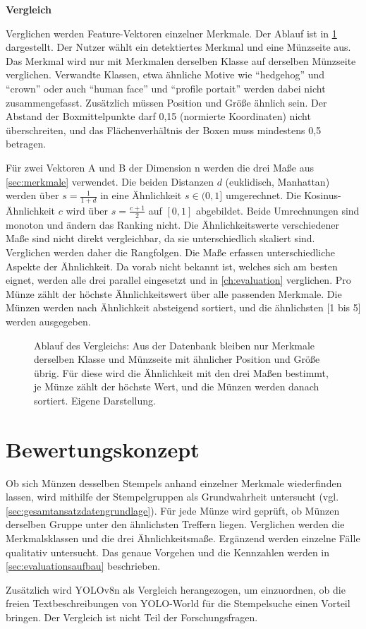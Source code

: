 \noindent \textbf{Vergleich}

\noindent Verglichen werden Feature-Vektoren einzelner Merkmale. Der Ablauf ist in \cref{fig:vergleich} dargestellt. Der Nutzer wählt ein detektiertes Merkmal und eine Münzseite aus. Das Merkmal wird nur mit Merkmalen derselben Klasse auf derselben Münzseite verglichen. Verwandte Klassen, etwa ähnliche Motive wie \enquote{hedgehog} und \enquote{crown} oder auch \enquote{human face} und \enquote{profile portait} werden dabei nicht zusammengefasst. Zusätzlich müssen Position und Größe ähnlich sein. Der Abstand der Boxmittelpunkte darf 0,15 (normierte Koordinaten) nicht überschreiten, und das Flächenverhältnis der Boxen muss mindestens 0,5 betragen.

Für zwei Vektoren A und B der Dimension n werden die drei Maße aus \cref{sec:merkmale} verwendet. Die beiden Distanzen $d$ (euklidisch, Manhattan) werden über $s = \frac{1}{1+d}$ in eine Ähnlichkeit $s \in (0, 1]$ umgerechnet. Die Kosinus-Ähnlichkeit $c$ wird über $s = \frac{c+1}{2}$ auf $[0, 1]$ abgebildet. Beide Umrechnungen sind monoton und ändern das Ranking nicht. Die Ähnlichkeitswerte verschiedener Maße sind nicht direkt vergleichbar, da sie unterschiedlich skaliert sind. Verglichen werden daher die Rangfolgen. Die Maße erfassen unterschiedliche Aspekte der Ähnlichkeit. Da vorab nicht bekannt ist, welches sich am besten eignet, werden alle drei parallel eingesetzt und in \cref{ch:evaluation} verglichen. 
Pro Münze zählt der höchste Ähnlichkeitswert über alle passenden Merkmale. Die Münzen werden nach Ähnlichkeit absteigend sortiert, und die ähnlichsten [1 bis 5] werden ausgegeben. 

\begin{figure}[H]
  \centering
  \resizebox{\linewidth}{!}{}
  \caption[Ablauf des Vergleichs]{Ablauf des Vergleichs: Aus der Datenbank bleiben nur Merkmale derselben Klasse und Münzseite mit ähnlicher Position und Größe übrig. Für diese wird die Ähnlichkeit mit den drei Maßen bestimmt, je Münze zählt der höchste Wert, und die Münzen werden danach sortiert. Eigene Darstellung.}
  \label{fig:vergleich}
\end{figure}

\section{Bewertungskonzept}
\label{sec:bewertungskonzept}
Ob sich Münzen desselben Stempels anhand einzelner Merkmale wiederfinden lassen, wird mithilfe der Stempelgruppen als Grundwahrheit untersucht (vgl. \cref{sec:gesamtansatzdatengrundlage}). Für jede Münze wird geprüft, ob Münzen derselben Gruppe unter den ähnlichsten Treffern liegen. Verglichen werden die Merkmalsklassen und die drei Ähnlichkeitsmaße. Ergänzend werden einzelne Fälle qualitativ untersucht. Das genaue Vorgehen und die Kennzahlen werden in \cref{sec:evaluationsaufbau} beschrieben.

Zusätzlich wird YOLOv8n als Vergleich herangezogen, um einzuordnen, ob die freien Textbeschreibungen von YOLO-World für die Stempelsuche einen Vorteil bringen. Der Vergleich ist nicht Teil der Forschungsfragen.